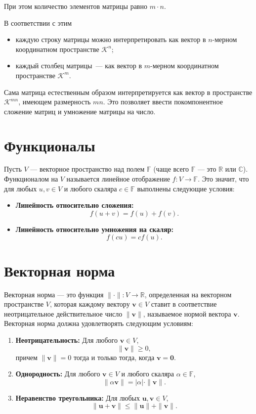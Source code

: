\documentclass{article}
\begin{document}
При этом количество элементов матрицы равно $m \cdot n$.

В соответствии с этим

\begin{itemize}
    \item каждую строку матрицы можно интерпретировать как вектор в $n$-мерном координатном пространстве $\mathcal{K}^{n}$;
    \item каждый столбец матрицы — как вектор в $m$-мерном координатном пространстве $\mathcal{K}^{m}$.
\end{itemize}


Сама матрица естественным образом интерпретируется как вектор в пространстве $\mathcal{K}^{mn}$, имеющем размерность $mn$. Это позволяет ввести покомпонентное сложение матриц и умножение матрицы на число.

\section{Функционалы}

Пусть $V$ — векторное пространство над полем $\mathbb{F}$ (чаще всего $\mathbb{F}$ — это $\mathbb{R}$ или $\mathbb{C}$). Функционалом на $V$ называется линейное отображение $f: V \to \mathbb{F}$. Это значит, что для любых $u, v \in V$ и любого скаляра $c \in \mathbb{F}$ выполнены следующие условия:

\begin{itemize}
    \item \textbf{Линейность относительно сложения:}
    \[
    f(u + v) = f(u) + f(v).
    \]
    \item \textbf{Линейность относительно умножения на скаляр:}
    \[
    f(cu) = cf(u).
    \]
\end{itemize}
\section{Векторная норма}
Векторная норма — это функция $\|\cdot\|: V \to \mathbb{R}$, определенная на векторном пространстве $V$, которая каждому вектору $\mathbf{v} \in V$ ставит в соответствие неотрицательное действительное число $\|\mathbf{v}\|$, называемое нормой вектора $\mathbf{v}$. Векторная норма должна удовлетворять следующим условиям:

\begin{enumerate}
    \item \textbf{Неотрицательность:} Для любого $\mathbf{v} \in V$,
    \[
    \|\mathbf{v}\| \geq 0,
    \]
    причем $\|\mathbf{v}\| = 0$ тогда и только тогда, когда $\mathbf{v} = \mathbf{0}$.
    
    \item \textbf{Однородность:} Для любого $\mathbf{v} \in V$ и любого скаляра $\alpha \in \mathbb{F}$,
    \[
    \|\alpha \mathbf{v}\| = |\alpha| \cdot \|\mathbf{v}\|.
    \]
    
    \item \textbf{Неравенство треугольника:} Для любых $\mathbf{u}, \mathbf{v} \in V$,
    \[
    \|\mathbf{u} + \mathbf{v}\| \leq \|\mathbf{u}\| + \|\mathbf{v}\|.
    \]
\end{enumerate}
\end{document}
